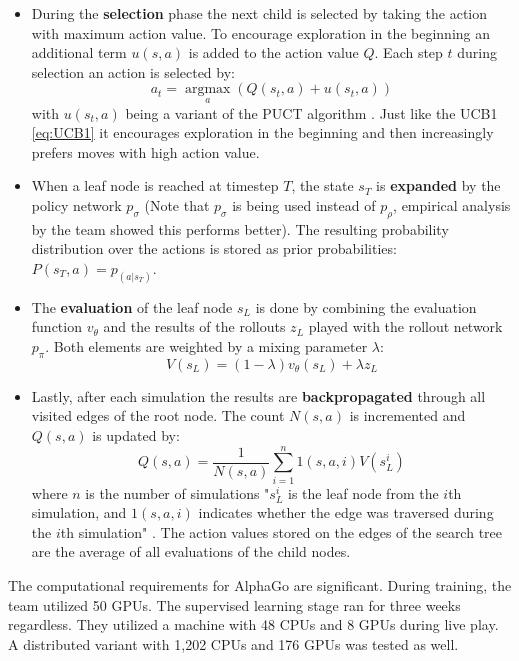 \begin{itemize}
    \item During the \textbf{selection} phase the next child is selected by taking the action with maximum action value. To encourage exploration in the beginning an additional term $u(s,a)$ is added to the action value $Q$. Each step $t$ during selection an action is selected by:
          \begin{equation}
              a_t = \operatorname*{argmax}_a (Q(s_t,a) + u(s_t, a))
          \end{equation}
          with $u(s_t, a)$ being a variant of the PUCT algorithm \cite{rosin_multi-armed_2011}. Just like the UCB1 \ref{eq:UCB1} it encourages exploration in the beginning and then increasingly prefers moves with high action value.
    \item When a leaf node is reached at timestep $T$, the state $s_T$ is \textbf{expanded} by the policy network $p_{\sigma}$ (Note that $p_{\sigma}$ is being used instead of $p_{\rho}$, empirical analysis by the team showed this performs better). The resulting probability distribution over the actions is stored as prior probabilities: $P(s_T, a) = p_(a|s_T)$.
    \item The \textbf{evaluation} of the leaf node $s_L$ is done by combining the evaluation function $v_{\theta}$ and the results of the rollouts $z_L$ played with the rollout network $p_{\pi}$. Both elements are weighted by a mixing parameter $\lambda$:
          \begin{equation}
              V(s_L) = (1 - \lambda)v_{\theta}(s_L) + \lambda z_L
          \end{equation}
    \item Lastly, after each simulation the results are \textbf{backpropagated} through all visited edges of the root node. The count $N(s,a)$ is incremented and $Q(s,a)$ is updated by:
          \begin{equation}
              Q(s,a) = \frac{1}{N(s,a)}\sum_{i=1}^{n}1(s,a,i)V(s_L^i)
          \end{equation}
          where $n$ is the number of simulations "$s_L^i$ is the leaf node from the $i$th simulation, and $1(s,a,i)$ indicates whether the edge was traversed during the $i$th simulation" \cite[p. 529]{silver_mastering_2016}. The action values stored on the edges of the search tree are the average of all evaluations of the child nodes.
\end{itemize}

The computational requirements for AlphaGo are significant. During training, the team utilized 50 GPUs. The supervised learning stage ran for three weeks regardless. They utilized a machine with 48 CPUs and 8 GPUs during live play. A distributed variant with 1,202 CPUs and 176 GPUs was tested as well.

